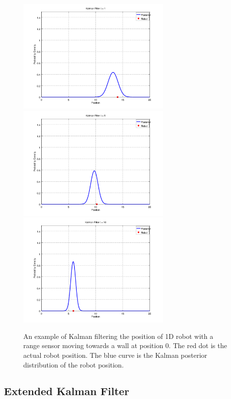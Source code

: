 \documentclass{article}
\begin{document}
\begin{figure}
\includegraphics[width=\linewidth,height=2.25in]{kalman/kalman1.png}
\includegraphics[width=\linewidth,height=2.25in]{kalman/kalman5.png}
\includegraphics[width=\linewidth,height=2.25in]{kalman/kalman10.png}
\caption{An example of Kalman filtering the position of 1D robot with a range sensor moving towards a wall at position 0.  The red dot is the actual robot position.  The blue curve is the Kalman posterior distribution of the robot position.}
\label{fig:kalman}
\end{figure}

\subsection{Extended Kalman Filter}
\end{document}

